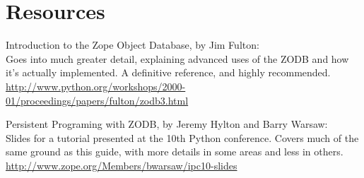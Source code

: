 
\section{Resources}

Introduction to the Zope Object Database, by Jim Fulton:
\\
Goes into much greater detail, explaining advanced uses of the ZODB and 
how it's actually implemented.  A definitive reference, and highly recommended.
\\
\url{http://www.python.org/workshops/2000-01/proceedings/papers/fulton/zodb3.html}

Persistent Programing with ZODB, by Jeremy Hylton and Barry Warsaw:
\\
Slides for a tutorial presented at the 10th Python conference.  Covers
much of the same ground as this guide, with more details in some areas
and less in others.
\\
\url{http://www.zope.org/Members/bwarsaw/ipc10-slides}


